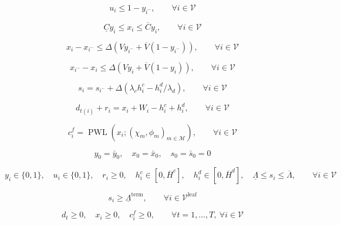 \documentclass{article}
\begin{document}
\begin{equation}
u_i \le 1-y_{i^-},
\qquad
\forall i \in \mathcal{V}
\tag{1d-2}
\end{equation}

\begin{equation}
\underline{C} y_i \le x_i \le \overline{C} y_i,
\qquad
\forall i \in \mathcal{V}
\tag{1e}
\end{equation}

\begin{equation}
x_i - x_{i^-} \le \Delta\left(V y_{i^-} + \overline{V}(1-y_{i^-})\right),
\qquad
\forall i \in \mathcal{V}
\tag{1f}
\end{equation}

\begin{equation}
x_{i^-} - x_i \le \Delta\left(V y_i + \overline{V}(1-y_i)\right),
\qquad
\forall i \in \mathcal{V}
\tag{1g}
\end{equation}

\begin{equation}
s_i = s_{i^-} + \Delta(\lambda_c h_i^c - h_i^d/\lambda_d),
\qquad
\forall i \in \mathcal{V}
\tag{1h}
\end{equation}

\begin{equation}
d_{t(i)} + r_i = x_i + W_i - h_i^c + h_i^d,
\qquad
\forall i \in \mathcal{V}
\tag{1i}
\end{equation}

\begin{equation}
c_i^f = \operatorname{PWL}(x_i;(\chi_m,\phi_m)_{m\in\mathcal{M}}),
\qquad
\forall i \in \mathcal{V}
\tag{1j}
\end{equation}

\begin{equation}
y_0 = \bar{y}_0,\quad
x_0 = \bar{x}_0,\quad
s_0 = \bar{s}_0=0
\tag{1k}
\end{equation}

\begin{equation}
y_i \in \{0,1\},\quad
u_i \in \{0,1\},\quad
r_i \ge 0,\quad
h_i^c \in [0,\overline{H}^c],\quad
h_i^d \in [0,\overline{H}^d],\quad
\underline{\Lambda} \le s_i \le \overline{\Lambda},
\qquad
\forall i \in \mathcal{V}
\tag{1l}
\end{equation}

\begin{equation}
s_i \ge \underline{\Lambda}^{\mathrm{term}},
\qquad
\forall i \in \mathcal{V}^{\mathrm{leaf}}
\tag{1l$'$}
\end{equation}

\begin{equation}
d_t \ge 0,\quad
x_i \ge 0,\quad
c_i^f \ge 0,
\qquad
\forall t=1,\ldots,T,\ \forall i \in \mathcal{V}
\tag{1m}
\end{equation}
\end{document}
